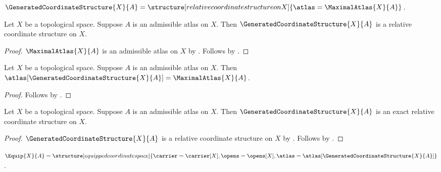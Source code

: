 \begin{definition}\label{generated_coordinate_structure}
    $\GeneratedCoordinateStructure{X}{A}=\structure[relative coordinate structure on X]{
        \atlas=\MaximalAtlas{X}{A}}$.
\end{definition}

\begin{classification}\label{generated_coordinate_structure_result}
    Let $X$ be a topological space.
    Suppose $A$ is an admissible atlas on $X$.
    Then $\GeneratedCoordinateStructure{X}{A}$ is a relative coordinate structure on $X$.
\end{classification}
\begin{proof}
    $\MaximalAtlas{X}{A}$ is an admissible atlas on $X$
        by .
    Follows by .
\end{proof}

\begin{proposition}\label{generated_coordinate_structureprojection_atlas}
    Let $X$ be a topological space.
    Suppose $A$ is an admissible atlas on $X$.
    Then $\atlas[\GeneratedCoordinateStructure{X}{A}]=\MaximalAtlas{X}{A}$.
\end{proposition}
\begin{proof}
    Follows by .
\end{proof}

\begin{theorem}\label{generated_coordinate_structureshape}
    Let $X$ be a topological space.
    Suppose $A$ is an admissible atlas on $X$.
    Then $\GeneratedCoordinateStructure{X}{A}$ is an exact relative coordinate structure on $X$.
\end{theorem}
\begin{proof}
    $\GeneratedCoordinateStructure{X}{A}$ is a relative coordinate structure on $X$
        by .
    Follows by .
\end{proof}

\begin{definition}\label{equip}
    $\Equip{X}{A}=\structure[equipped coordinate space]{
        \carrier=\carrier[X],\opens=\opens[X],
        \atlas=\atlas[\GeneratedCoordinateStructure{X}{A}]}$.
\end{definition}

